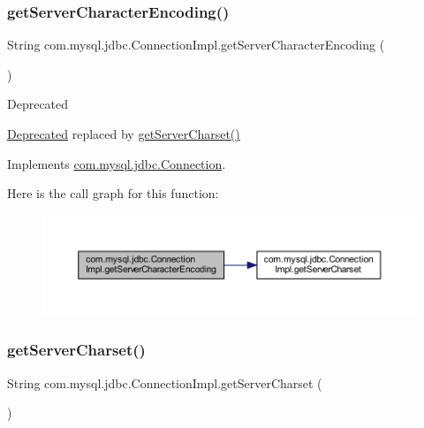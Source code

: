 \subsubsection{\texorpdfstring{get\+Server\+Character\+Encoding()}{getServerCharacterEncoding()}}
{\footnotesize\ttfamily String com.\+mysql.\+jdbc.\+Connection\+Impl.\+get\+Server\+Character\+Encoding (\begin{DoxyParamCaption}{ }\end{DoxyParamCaption})}

\begin{DoxyRefDesc}{Deprecated}
\item[\mbox{\hyperlink{deprecated__deprecated000009}{Deprecated}}]replaced by {\ttfamily \mbox{\hyperlink{classcom_1_1mysql_1_1jdbc_1_1_connection_impl_aec1bc6ca740ae9b75d6cad0f3126a276}{get\+Server\+Charset()}}} \end{DoxyRefDesc}


Implements \mbox{\hyperlink{interfacecom_1_1mysql_1_1jdbc_1_1_connection_ab6e0170645e189b8622642705f7cc3a4}{com.\+mysql.\+jdbc.\+Connection}}.

Here is the call graph for this function\+:\nopagebreak
\begin{figure}[H]
\begin{center}
\leavevmode
\includegraphics[width=350pt]{classcom_1_1mysql_1_1jdbc_1_1_connection_impl_ac6f97840677e30fabce87c044819e2c1_cgraph}
\end{center}
\end{figure}
\mbox{\label{classcom_1_1mysql_1_1jdbc_1_1_connection_impl_aec1bc6ca740ae9b75d6cad0f3126a276}} 
\subsubsection{\texorpdfstring{get\+Server\+Charset()}{getServerCharset()}}
{\footnotesize\ttfamily String com.\+mysql.\+jdbc.\+Connection\+Impl.\+get\+Server\+Charset (\begin{DoxyParamCaption}{ }\end{DoxyParamCaption})}

